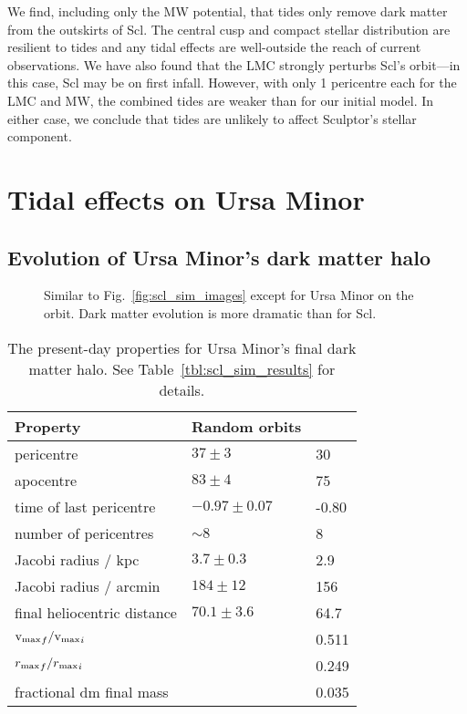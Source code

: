 We find, including only the MW potential, that tides only remove dark
matter from the outskirts of Scl. The central cusp and compact stellar
distribution are resilient to tides and any tidal effects are
well-outside the reach of current observations. We have also found that
the LMC strongly perturbs Scl's orbit---in this case, Scl may be on
first infall. However, with only 1 pericentre each for the LMC and MW,
the combined tides are weaker than for our initial model. In either
case, we conclude that tides are unlikely to affect Sculptor's stellar
component.

\section{Tidal effects on Ursa Minor}\label{tidal-effects-on-ursa-minor}

\subsection{Evolution of Ursa Minor's dark matter
halo}\label{evolution-of-ursa-minors-dark-matter-halo}

\begin{figure}
\centering
{}
\caption[Ursa Minor simulation snapshots]{Similar to
Fig.~\ref{fig:scl_sim_images} except for Ursa Minor on the \smallperi{}
orbit. Dark matter evolution is more dramatic than for
Scl.}\label{fig:umi_sim_images}
\end{figure}

\begin{table*}[t]
\centering
\caption[Simulation results for Ursa Minor’s dark matter]{The present-day properties for Ursa Minor’s final dark matter halo. See Table \ref{tbl:scl_sim_results} for details. }
\label{tbl:umi_sim_results}
\begin{tabular}{lll}
\toprule
Property & Random orbits & \smallperi{}\\
\midrule
pericentre & $37\pm3$ & 30\\
apocentre & $83 \pm 4$ & 75\\
time of last pericentre & $-0.97 \pm 0.07$ & -0.80\\
number of pericentres & $\sim 8$ & 8\\
Jacobi radius / kpc & $3.7 \pm 0.3$ & 2.9\\
Jacobi radius / arcmin & $184 \pm 12$ & 156\\
final heliocentric distance & $70.1 \pm 3.6$ & 64.7\\
${{\rm v}_{\rm max}}_f / {{\rm v}_{\rm max}}_i$ &  & 0.511\\
${r_{\rm max}}_f / {r_{\rm max}}_i$ &  & 0.249\\
fractional dm final mass &  & 0.035\\
\bottomrule
\end{tabular}
\end{table*}

